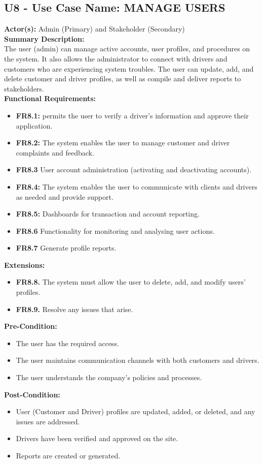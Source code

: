 \documentclass[9pt]{report}
\begin{document}
\subsection*{U8 - Use Case Name: MANAGE USERS}
\textbf{Actor(s):} Admin (Primary) and Stakeholder (Secondary)
\textbf{\\Summary Description:} \\ The user (admin) can manage active accounts, user profiles, and procedures on the system. It also allows the administrator to connect with drivers and customers who are experiencing system troubles. The user can update, add, and delete customer and driver profiles, as well as compile and deliver reports to stakeholders.\\
\textbf{Functional Requirements:}
\begin{itemize}
    \item \textbf{FR8.1:} permits the user to verify a driver's information and approve their application.
    \item \textbf{FR8.2:} The system enables the user to manage customer and driver complaints and feedback.
    \item \textbf{FR8.3} User account administration (activating and deactivating accounts).
    \item \textbf{FR8.4:} The system enables the user to communicate with clients and drivers as needed and provide support.
    \item \textbf{FR8.5:} Dashboards for transaction and account reporting.
    \item \textbf{FR8.6} Functionality for monitoring and analysing user actions.
    \item \textbf{FR8.7} Generate profile reports.
\end{itemize}
\textbf{Extensions:}
\begin{itemize}
    \item \textbf{FR8.8.} The system must allow the user to delete, add, and modify users' profiles.
    \item \textbf{FR8.9.} Resolve any issues that arise.
\end{itemize}
\textbf{Pre-Condition:} 
\begin{itemize}
    \item The user has the required access.
    \item The user maintains communication channels with both customers and drivers.
    \item The user understands the company's policies and processes.
\end{itemize}
\textbf{Post-Condition:} 
\begin{itemize}
    \item User (Customer and Driver) profiles are updated, added, or deleted, and any issues are addressed.
    \item Drivers have been verified and approved on the site.
    \item Reports are created or generated.
\end{itemize}
\end{document}
